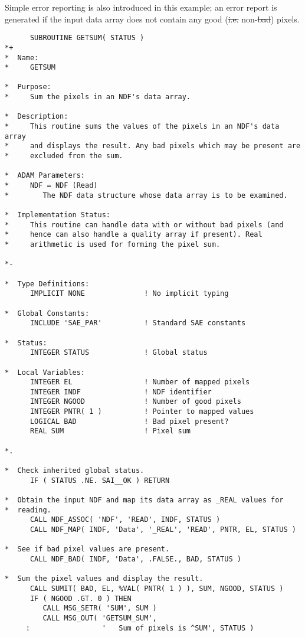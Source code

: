 Simple error reporting is also introduced in this example; an error report is
generated if the input data array does not contain any good (\st{i.e.\/}
non-\st{bad\/}) pixels.

\small
\begin{verbatim}
      SUBROUTINE GETSUM( STATUS )
*+
*  Name:
*     GETSUM

*  Purpose:
*     Sum the pixels in an NDF's data array.

*  Description:
*     This routine sums the values of the pixels in an NDF's data array
*     and displays the result. Any bad pixels which may be present are
*     excluded from the sum.

*  ADAM Parameters:
*     NDF = NDF (Read)
*        The NDF data structure whose data array is to be examined.

*  Implementation Status:
*     This routine can handle data with or without bad pixels (and
*     hence can also handle a quality array if present). Real
*     arithmetic is used for forming the pixel sum.

*-
      
*  Type Definitions:
      IMPLICIT NONE              ! No implicit typing

*  Global Constants:
      INCLUDE 'SAE_PAR'          ! Standard SAE constants

*  Status:
      INTEGER STATUS             ! Global status

*  Local Variables:
      INTEGER EL                 ! Number of mapped pixels
      INTEGER INDF               ! NDF identifier
      INTEGER NGOOD              ! Number of good pixels
      INTEGER PNTR( 1 )          ! Pointer to mapped values
      LOGICAL BAD                ! Bad pixel present?
      REAL SUM                   ! Pixel sum

*.

*  Check inherited global status.
      IF ( STATUS .NE. SAI__OK ) RETURN

*  Obtain the input NDF and map its data array as _REAL values for
*  reading.
      CALL NDF_ASSOC( 'NDF', 'READ', INDF, STATUS )
      CALL NDF_MAP( INDF, 'Data', '_REAL', 'READ', PNTR, EL, STATUS )

*  See if bad pixel values are present.
      CALL NDF_BAD( INDF, 'Data', .FALSE., BAD, STATUS )

*  Sum the pixel values and display the result.
      CALL SUMIT( BAD, EL, %VAL( PNTR( 1 ) ), SUM, NGOOD, STATUS )
      IF ( NGOOD .GT. 0 ) THEN
         CALL MSG_SETR( 'SUM', SUM )
         CALL MSG_OUT( 'GETSUM_SUM',
     :                 '   Sum of pixels is ^SUM', STATUS )


\end{verbatim}
